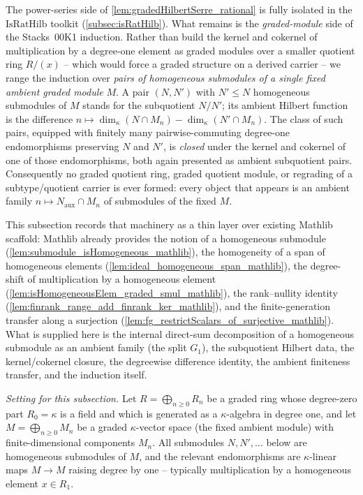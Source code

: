 The power-series side of \cref{lem:gradedHilbertSerre_rational} is fully isolated
in the \(\mathrm{IsRatHilb}\) toolkit (\cref{subsec:isRatHilb}). What remains is
the \emph{graded-module} side of the Stacks~00K1 induction. Rather than build the
kernel and cokernel of multiplication by a degree-one element as graded modules
over a smaller quotient ring \(R/(x)\) -- which would force a graded structure on a
derived carrier -- we range the induction over \emph{pairs of homogeneous
submodules of a single fixed ambient graded module} \(M\). A pair \((N, N')\) with
\(N' \le N\) homogeneous submodules of \(M\) stands for the subquotient \(N/N'\); its
ambient Hilbert function is the difference \(n \mapsto \dim_\kappa(N \cap M_n) -
\dim_\kappa(N' \cap M_n)\). The class of such pairs, equipped with finitely many
pairwise-commuting degree-one endomorphisms preserving \(N\) and \(N'\), is
\emph{closed} under the kernel and cokernel of one of those endomorphisms, both
again presented as ambient subquotient pairs. Consequently no graded quotient ring,
graded quotient module, or regrading of a subtype/quotient carrier is ever formed:
every object that appears is an ambient family \(n \mapsto N_{\mathrm{aux}} \cap M_n\)
of submodules of the fixed \(M\).

This subsection records that machinery as a thin layer over existing Mathlib
scaffold: Mathlib already provides the notion of a homogeneous submodule
(\cref{lem:submodule_isHomogeneous_mathlib}), the homogeneity of a span of
homogeneous elements (\cref{lem:ideal_homogeneous_span_mathlib}), the degree-shift
of multiplication by a homogeneous element
(\cref{lem:isHomogeneousElem_graded_smul_mathlib}), the rank--nullity identity
(\cref{lem:finrank_range_add_finrank_ker_mathlib}), and the finite-generation
transfer along a surjection (\cref{lem:fg_restrictScalars_of_surjective_mathlib}).
What is supplied here is the internal direct-sum decomposition of a homogeneous
submodule as an ambient family (the split \(G_1\)), the subquotient Hilbert data,
the kernel/cokernel closure, the degreewise difference identity, the ambient
finiteness transfer, and the induction itself.

\emph{Setting for this subsection.} Let \(R = \bigoplus_{n \ge 0} R_n\) be a graded
ring whose degree-zero part \(R_0 = \kappa\) is a field and which is generated as a
\(\kappa\)-algebra in degree one, and let \(M = \bigoplus_{n \ge 0} M_n\) be a graded
\(\kappa\)-vector space (the fixed ambient module) with finite-dimensional
components \(M_n\). All submodules \(N, N', \dots\) below are homogeneous submodules
of \(M\), and the relevant endomorphisms are \(\kappa\)-linear maps \(M \to M\)
raising degree by one -- typically multiplication by a homogeneous element
\(x \in R_1\).

